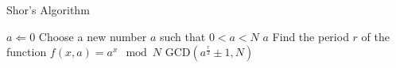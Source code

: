 \begin{algorithm}[H]
\caption{Shor's Algorithm}
\begin{algorithmic}
    \STATE $a \Leftarrow 0$
    \REPEAT
        \STATE Choose a new number $a$ such that $0 < a < N$
            \RETURN $a$
        \ENDIF
        \STATE Find the period $r$ of the function $f\left(x, a\right) = a^x \mod{N}$
    \RETURN $\mbox{GCD}\left(a^{\frac{r}{2}} \pm 1, N\right)$
\end{algorithmic}
\end{algorithm}